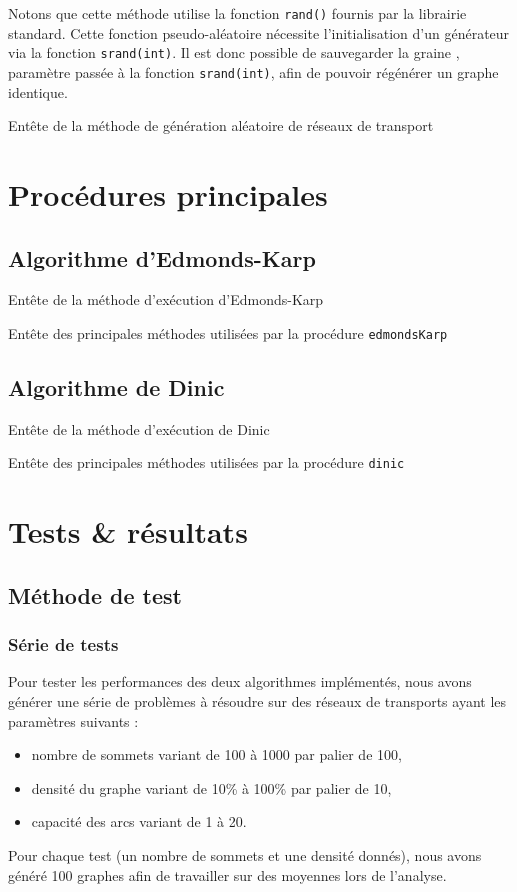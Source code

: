 Notons que cette méthode utilise la fonction \texttt{rand()} fournis par la librairie standard. Cette fonction \og pseudo-aléatoire \fg nécessite l'initialisation d'un générateur via la fonction \texttt{srand(int)}. Il est donc possible de sauvegarder la \og graine \fg, paramètre passée à la fonction \texttt{srand(int)}, afin de pouvoir régénérer un graphe identique.

Entête de la méthode de génération aléatoire de réseaux de transport


\section{Procédures principales}

\subsection{Algorithme d'Edmonds-Karp}

Entête de la méthode d'exécution d'Edmonds-Karp


Entête des principales méthodes utilisées par la procédure \texttt{edmondsKarp}


\subsection{Algorithme de Dinic}

Entête de la méthode d'exécution de Dinic


Entête des principales méthodes utilisées par la procédure \texttt{dinic}


\section{Tests \& résultats}

\subsection{Méthode de test}

\subsubsection{Série de tests}
Pour tester les performances des deux algorithmes implémentés, nous avons générer une série de problèmes à résoudre sur des réseaux de transports ayant les paramètres suivants :
\begin{itemize}
\item nombre de sommets variant de 100 à 1000 par palier de 100,
\item densité du graphe variant de 10\% à 100\% par palier de 10,
\item capacité des arcs variant de 1 à 20.
\end{itemize}
Pour chaque test (un nombre de sommets et une densité donnés), nous avons généré 100 graphes afin de travailler sur des moyennes lors de l'analyse.

